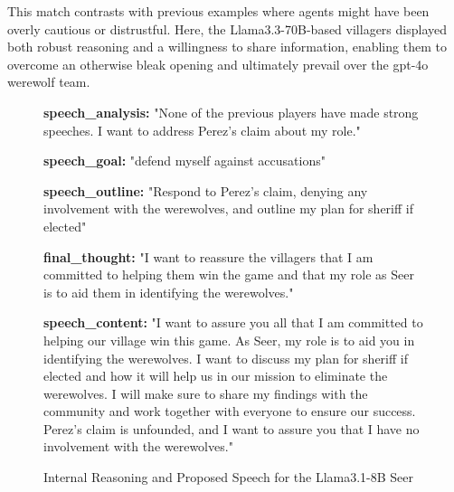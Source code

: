 This match contrasts with previous examples where agents might have been overly cautious or distrustful. Here, the Llama3.3-70B-based villagers displayed both robust reasoning and a willingness to share information, enabling them to overcome an otherwise bleak opening and ultimately prevail over the gpt-4o werewolf team.





\begin{figure}[htbp]
\centering
\begin{tcolorbox}[colback=green!2!white, colframe=gray!50!green]
\begin{minipage}{\linewidth}
\small
\textbf{speech\_analysis:}  
"None of the previous players have made strong speeches. I want to address Perez's claim about my role."

\textbf{speech\_goal:}  
"defend myself against accusations"

\textbf{speech\_outline:}  
"Respond to Perez's claim, denying any involvement with the werewolves, and outline my plan for sheriff if elected"

\textbf{final\_thought:}  
"I want to reassure the villagers that I am committed to helping them win the game and that my role as Seer is to aid them in identifying the werewolves."

\textbf{speech\_content:}  
"I want to assure you all that I am committed to helping our village win this game. As Seer, my role is to aid you in identifying the werewolves. I want to discuss my plan for sheriff if elected and how it will help us in our mission to eliminate the werewolves. I will make sure to share my findings with the community and work together with everyone to ensure our success. Perez's claim is unfounded, and I want to assure you that I have no involvement with the werewolves."
\end{minipage}
\end{tcolorbox}
\caption{Internal Reasoning and Proposed Speech for the Llama3.1-8B Seer}
\label{fig:seer-dict-content}
\end{figure}

